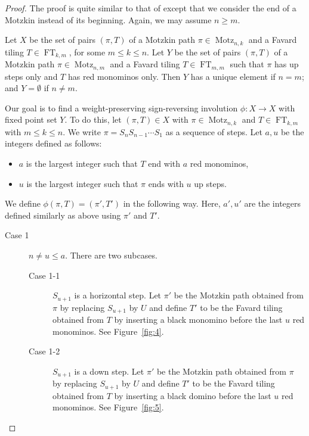 \documentclass[oneside]{book}
\numberwithin{equation}{section}
\theoremstyle{definition}
\newcommand\Motz{\operatorname{Motz}}
\newcommand\FT{\operatorname{FT}}
\begin{document}
\begin{proof}
  The proof is quite similar to that of  except that we
  consider the end of a Motzkin instead of its beginning. Again, we
  may assume \( n\ge m \).

  Let \( X \) be the set of pairs \( (\pi,T) \) of a Motzkin path
  \( \pi\in \Motz_{n,k} \) and a Favard tiling \( T\in \FT_{k,m} \),
  for some \( m\le k\le n \). Let \( Y \) be the set of pairs
  \( (\pi,T) \) of a Motzkin path \( \pi\in \Motz_{n,m} \) and a
  Favard tiling \( T\in \FT_{m,m} \) such that \( \pi \) has up steps
  only and \( T \) has red monominos only. Then \( Y \) has a unique
  element if \( n=m \); and \( Y=\emptyset \) if \( n\ne m \).

  Our goal is to find a weight-preserving sign-reversing involution
  \( \phi: X \to X \) with fixed point set \( Y \). To do this, let
  \( (\pi,T)\in X \) with \( \pi\in \Motz_{n,k} \) and
  \( T\in \FT_{k,m} \) with \( m\le k\le n \). We write
  \( \pi=S_nS_{n-1} \cdots S_{1} \) as a sequence of steps. Let
  \( a,u \) be the integers defined as follows:
 \begin{itemize}
 \item \( a \) is the largest integer such that \( T \)
   end with \( a \) red monominos,
 \item \( u \) is the largest integer such that \( \pi \) ends with
   \( u \) up steps.
 \end{itemize}
 We define \( \phi(\pi,T)= (\pi',T') \) in the following way. Here,
 \( a',u' \) are the integers defined similarly as above using
 \( \pi' \) and \( T' \).
\begin{description}
\item[Case 1] \( n\ne u\le a \). There are two
  subcases.
\begin{description}
\item[Case 1-1] \( S_{u+1} \) is a horizontal step. Let \( \pi' \) be
  the Motzkin path obtained from \( \pi \) by replacing \( S_{u+1} \)
  by \( U \) and define $T'$ to be the Favard tiling obtained from $T$
  by inserting a black monomino before the last \( u \) red monominos.
  See Figure~\ref{fig:4}.
\item[Case 1-2] $S_{u+1}$ is a down step. Let \( \pi' \) be
  the Motzkin path obtained from \( \pi \) by replacing \( S_{u+1} \)
  by \( U \) and define $T'$ to be the Favard tiling obtained from $T$
  by inserting a black domino before the last \( u \) red monominos.
 See Figure~\ref{fig:5}.
\end{description}


\end{description}
\end{proof}
\end{document}
